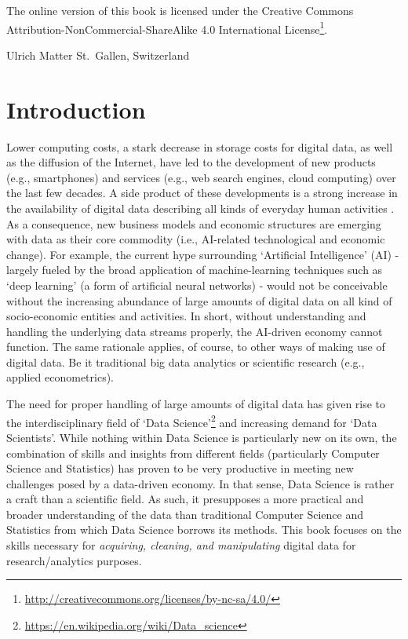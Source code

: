 \documentclass[
  12pt,
]{style/krantz}
\renewcommand{\href}[2]{#2\footnote{\url{#1}}}
\begin{document}
The online version of this book is licensed under the \href{http://creativecommons.org/licenses/by-nc-sa/4.0/}{Creative Commons Attribution-NonCommercial-ShareAlike 4.0 International License}.

\begin{flushright}
Ulrich Matter
St.~Gallen, Switzerland
\end{flushright}

\mainmatter

\hypertarget{introduction}{%
\chapter{Introduction}\label{introduction}}

Lower computing costs, a stark decrease in storage costs for digital data, as well as the diffusion of the Internet, have led to the development of new products (e.g., smartphones) and services (e.g., web search engines, cloud computing) over the last few decades. A side product of these developments is a strong increase in the availability of digital data describing all kinds of everyday human activities \citep{einav_levin2014, matter_stutzer2015}. As a consequence, new business models and economic structures are emerging with data as their core commodity (i.e., AI-related technological and economic change). For example, the current hype surrounding `Artificial Intelligence' (AI) - largely fueled by the broad application of machine-learning techniques such as `deep learning' (a form of artificial neural networks) - would not be conceivable without the increasing abundance of large amounts of digital data on all kind of socio-economic entities and activities. In short, without understanding and handling the underlying data streams properly, the AI-driven economy cannot function. The same rationale applies, of course, to other ways of making use of digital data. Be it traditional big data analytics or scientific research (e.g., applied econometrics).

The need for proper handling of large amounts of digital data has given rise to the interdisciplinary field of \href{https://en.wikipedia.org/wiki/Data_science}{`Data Science'} and increasing demand for `Data Scientists'. While nothing within Data Science is particularly new on its own, the combination of skills and insights from different fields (particularly Computer Science and Statistics) has proven to be very productive in meeting new challenges posed by a data-driven economy. In that sense, Data Science is rather a craft than a scientific field. As such, it presupposes a more practical and broader understanding of the data than traditional Computer Science and Statistics from which Data Science borrows its methods. This book focuses on the skills necessary for \emph{acquiring, cleaning, and manipulating} digital data for research/analytics purposes.
\end{document}
